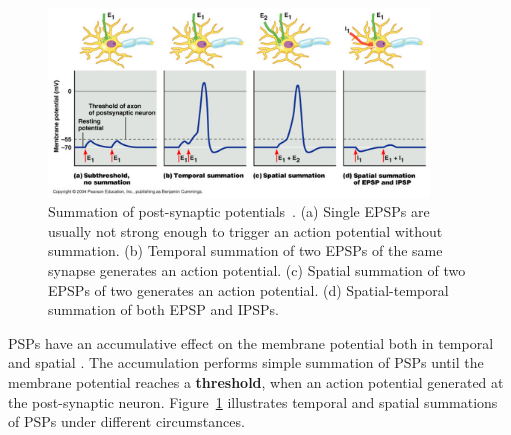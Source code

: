 


\begin{figure}[bt!]
	\centering
	\includegraphics[width=0.9\textwidth]{pics_snn/psp.png}
	\caption{Summation of post-synaptic potentials~\citep{reece2011campbell}. 
		(a) Single EPSPs are usually not strong enough to trigger an action potential without summation. (b) Temporal summation of two EPSPs of the same synapse generates an action potential. (c) Spatial summation of two EPSPs of two \DIFdelbeginFL {}\DIFdelendFL \DIFaddbeginFL {}\DIFaddendFL generates an action potential. (d) Spatial-temporal summation of both EPSP and IPSPs.
	}
	\label{Fig:psp_sum}
\end{figure}

\DIFdelbegin {}\DIFdelend \DIFaddbegin {}\DIFaddend PSPs have an accumulative effect on the membrane potential both in temporal and spatial \DIFaddbegin {}\DIFaddend .
The accumulation performs \DIFaddbegin {}\DIFaddend simple summation of PSPs until the membrane potential reaches a \textbf{threshold}, when an action potential \DIFdelbegin {}\DIFdelend \DIFaddbegin {}\DIFaddend generated at the post-synaptic neuron.
Figure~\ref{Fig:psp_sum} illustrates temporal and spatial summations of PSPs under different circumstances.

